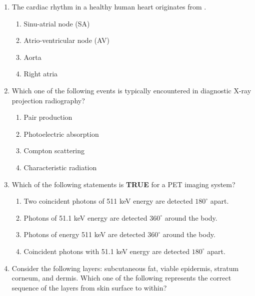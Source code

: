 \documentclass[a4paper,12pt]{exam}
\numberwithin{equation}{enumi}
\numberwithin{figure}{enumi}
\begin{document}
\begin{enumerate}
\item The cardiac rhythm in a healthy human heart originates from \underline{\hspace{1cm}}.

\hfill{}

\begin{enumerate}
\item Sinu-atrial node (SA) 
\item Atrio-ventricular node (AV) 
\item Aorta 
\item Right atria 
\end{enumerate} 

\item Which one of the following events is  typically encountered in diagnostic X-ray projection radiography?

\hfill{}

\begin{enumerate}
 \item Pair production 
\item Photoelectric absorption 
\vspace{0.25cm}
\item Compton scattering 
\item Characteristic radiation 
\end{enumerate}  

\item Which of the following statements is \textbf{TRUE} for a PET imaging system?    

\hfill{}

\begin{enumerate}
 \item Two coincident photons of 511 keV energy are detected $180^\circ$ apart. 
\item Photons of 51.1 keV energy are detected $360^\circ$ around the body.  
\item Photons of energy 511 keV are detected $360^\circ$ around the body.
\item Coincident photons with 51.1 keV energy are detected $180^\circ$ apart. 
\end{enumerate}  

\item Consider the following layers: subcutaneous fat, viable epidermis, stratum 
corneum, and dermis. Which one of the following represents the correct sequence  of the layers from skin surface to within?


\end{enumerate}
\end{document}
